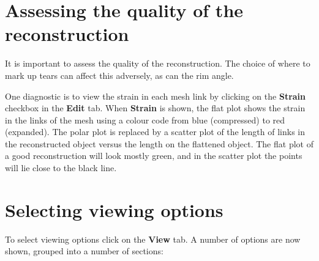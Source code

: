 \documentclass{book}
\begin{document}
\section{Assessing the quality of the reconstruction}
\label{retistruct-user-guide:sec:assess-qual-reconstr}

It is important to assess the quality of the reconstruction. The
choice of where to mark up tears can affect this adversely, as can the
rim angle.

One diagnostic is to view the strain in each mesh link by clicking on
the \textbf{Strain} checkbox in the \textbf{Edit} tab. When \textbf{Strain}
is shown, the flat plot shows the strain in the links of the mesh
using a colour code from blue (compressed) to red (expanded). The
polar plot is replaced by a scatter plot of the length of links in the
reconstructed object versus the length on the flattened object. The
flat plot of a good reconstruction will look mostly green, and in the
scatter plot the points will lie close to the black line.

\section{Selecting viewing options}
\label{retistruct-user-guide:sec:select-view-opti}

To select viewing options click on the \textbf{View} tab. A number of
options are now shown, grouped into a number of sections:
\end{document}
